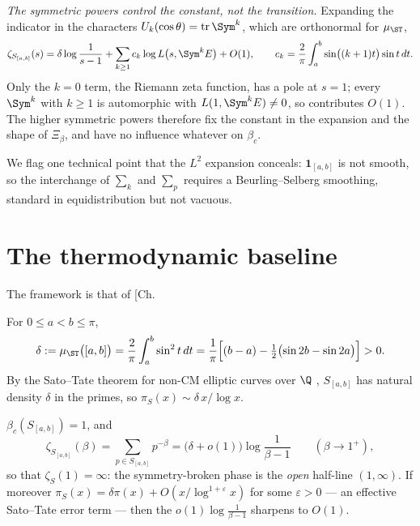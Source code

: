 \begin{summary}
\emph{The symmetric powers control the constant, not the transition.} Expanding the indicator
in the characters $U_k(\cos\theta)=\Tr\Sym^k$, which are orthonormal for $\mu_\ST$,
\[
\zeta_{S_{[a,b]}}(s)=\delta\log\frac{1}{s-1}+\sum_{k\ge1}c_k\log L\bigl(s,\Sym^kE\bigr)+O(1),
\qquad
c_k=\frac2\pi\int_a^b\sin\bigl((k+1)t\bigr)\sin t\,dt .
\]
Only the $k=0$ term, the Riemann zeta function, has a pole at $s=1$; every $\Sym^k$ with
$k\ge1$ is automorphic with $L(1,\Sym^kE)\ne0$, so contributes $O(1)$. The higher symmetric
powers therefore fix the constant in the expansion and the shape of $\Xi_\beta$, and have no
influence whatever on $\beta_c$.

We flag one technical point that the $L^2$ expansion conceals: $\mathbf 1_{[a,b]}$ is not
smooth, so the interchange of $\sum_k$ and $\sum_p$ requires a Beurling--Selberg smoothing,
standard in equidistribution but not vacuous.
\end{summary}


\section{The thermodynamic baseline}

The framework is that of [Ch.\begin{proposition}[Density]\label{XXV:prop:density}
For $0\le a<b\le\pi$,
\[
\delta:=\mu_\ST\bigl([a,b]\bigr)=\frac{2}{\pi}\int_a^b\sin^2t\,dt
=\frac{1}{\pi}\Bigl[(b-a)-\tfrac12\bigl(\sin2b-\sin2a\bigr)\Bigr]>0 .
\]
By the Sato--Tate theorem for non-CM elliptic curves over $\Q$ \cite{BLGHT}, $S_{[a,b]}$ has natural
density $\delta$ in the primes, so $\pi_S(x)\sim\delta\,x/\log x$.
\end{proposition}

\begin{theorem}\label{XXV:thm:open}
$\beta_c(S_{[a,b]})=1$, and
\begin{equation}\label{XXV:eq:asym}
\zeta_{S_{[a,b]}}(\beta)=\sum_{p\in S_{[a,b]}}p^{-\beta}=\bigl(\delta+o(1)\bigr)\log\frac{1}{\beta-1}
\qquad(\beta\to1^+),
\end{equation}
so that $\zeta_S(1)=\infty$: the symmetry-broken phase is the \emph{open} half-line
$(1,\infty)$. If moreover $\pi_S(x)=\delta\pi(x)+O(x/\log^{1+\varepsilon}x)$ for some
$\varepsilon>0$ --- an effective Sato--Tate error term --- then the $o(1)\log\frac1{\beta-1}$
sharpens to $O(1)$.
\end{theorem}

